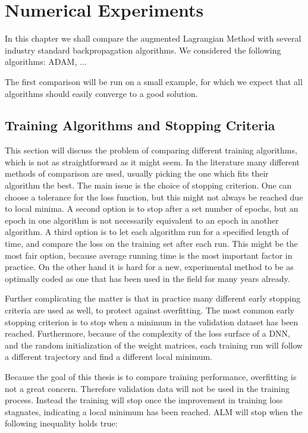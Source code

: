 \chapter{Numerical Experiments}
\label{cha:3}
In this chapter we shall compare the augmented Lagrangian Method with several industry standard backpropagation algorithms. We considered the following algorithms: ADAM, ...

The first comparison will be run on a small example, for which we expect that all algorithms should easily converge to a good solution.

\section{Training Algorithms and Stopping Criteria}
This section will discuss the problem of comparing different training algorithms, which is not as straightforward as it might seem. In the literature many different methods of comparison are used, usually picking the one which fits their algorithm the best. The main issue is the choice of stopping criterion. One can choose a tolerance for the loss function, but this might not always be reached due to local minima. A second option is to stop after a set number of epochs, but an epoch in one algorithm is not necessarily equivalent to an epoch in another algorithm. A third option is to let each algorithm run for a specified length of time, and compare the loss on the training set after each run. This might be the most fair option, because average running time is the most important factor in practice. On the other hand it is hard for a new, experimental method to be as optimally coded as one that has been used in the field for many years already.

Further complicating the matter is that in practice many different early stopping criteria are used as well, to protect against overfitting. The most common early stopping criterion is to stop when a minimum in the validation dataset has been reached. Furthermore, because of the complexity of the loss surface of a DNN, and the random initialization of the weight matrices, each training run will follow a different trajectory and find a different local minimum.

Because the goal of this thesis is to compare training performance, overfitting is not a great concern. Therefore validation data will not be used in the training process. Instead the training will stop once the improvement in training loss stagnates, indicating a local minimum has been reached. ALM will stop when the following inequality holds true:

